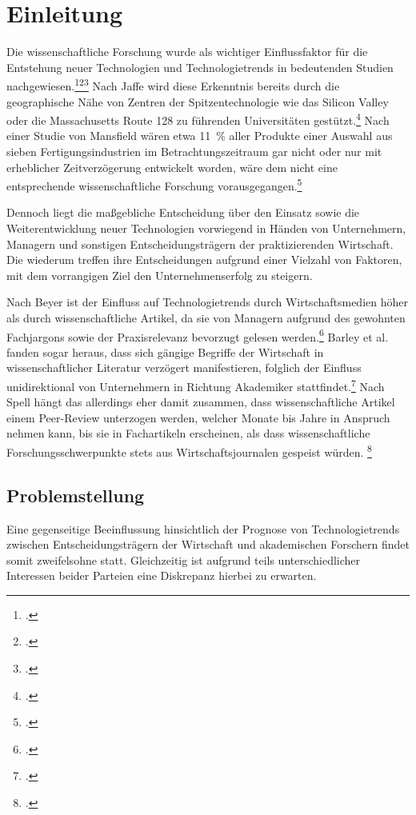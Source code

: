 \section{Einleitung}
Die wissenschaftliche Forschung wurde als wichtiger Einflussfaktor für die Entstehung neuer Technologien und Technologietrends in bedeutenden Studien nachgewiesen.\footcite[Vgl.][S.~11]{Mansfield1991}\footcite[Vgl.][S.~1652]{Gruber2008}\footcite[Vgl.][S.~599]{Tegarden2012} Nach Jaffe wird diese Erkenntnis bereits durch die geographische Nähe von Zentren der Spitzentechnologie wie das Silicon Valley oder die Massachusetts Route 128 zu führenden Universitäten gestützt.\footcite[Vgl.][S.~967f]{Jaffe1989} Nach einer Studie von Mansfield wären etwa 11~\% aller Produkte einer Auswahl aus sieben Fertigungsindustrien im Betrachtungszeitraum gar nicht oder nur mit erheblicher Zeitverzögerung entwickelt worden, wäre dem nicht eine entsprechende wissenschaftliche Forschung vorausgegangen.\footcite[Vgl.][S.~2]{Mansfield1991}

Dennoch liegt die maßgebliche Entscheidung über den Einsatz sowie die Weiterentwicklung neuer Technologien vorwiegend in Händen von Unternehmern, Managern und sonstigen Entscheidungsträgern der praktizierenden Wirtschaft. Die wiederum treffen ihre Entscheidungen aufgrund einer Vielzahl von Faktoren, mit dem vorrangigen Ziel den Unternehmenserfolg zu steigern. 

Nach Beyer ist der Einfluss auf Technologietrends durch Wirtschaftsmedien höher als durch wissenschaftliche Artikel, da sie von Managern aufgrund des gewohnten Fachjargons sowie der Praxisrelevanz bevorzugt gelesen werden.\footcite[Vgl.][S.~472]{Beyer1992} Barley et al. fanden sogar heraus, dass sich gängige Begriffe der Wirtschaft in wissenschaftlicher Literatur verzögert manifestieren, folglich der Einfluss unidirektional von Unternehmern in Richtung Akademiker stattfindet.\footcite[Vgl.][S.~52]{Barley1988} Nach Spell hängt das allerdings eher damit zusammen, dass wissenschaftliche Artikel einem Peer-Review unterzogen werden, welcher Monate bis Jahre in Anspruch nehmen kann, bis sie in Fachartikeln erscheinen, als dass wissenschaftliche Forschungsschwerpunkte stets aus Wirtschaftsjournalen gespeist würden. \footcite[Vgl.][S.~345]{Spell1999}

\subsection{Problemstellung}
Eine gegenseitige Beeinflussung hinsichtlich der Prognose von Technologietrends zwischen Entscheidungsträgern der Wirtschaft und akademischen Forschern findet somit zweifelsohne statt. Gleichzeitig ist aufgrund teils unterschiedlicher Interessen beider Parteien eine Diskrepanz hierbei zu erwarten.

